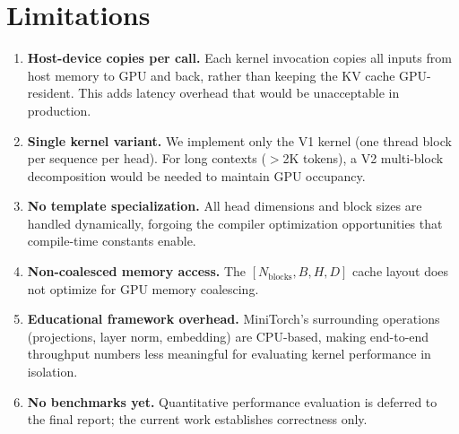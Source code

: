 \documentclass{article}
\begin{document}
\section{Limitations}
\label{sec:limitations}

\begin{enumerate}
    \item \textbf{Host-device copies per call.} Each kernel invocation copies all inputs from host memory to GPU and back, rather than keeping the KV cache GPU-resident. This adds latency overhead that would be unacceptable in production.
    
    \item \textbf{Single kernel variant.} We implement only the V1 kernel (one thread block per sequence per head). For long contexts ($>$2K tokens), a V2 multi-block decomposition would be needed to maintain GPU occupancy.
    
    \item \textbf{No template specialization.} All head dimensions and block sizes are handled dynamically, forgoing the compiler optimization opportunities that compile-time constants enable.
    
    \item \textbf{Non-coalesced memory access.} The $[N_{\text{blocks}}, B, H, D]$ cache layout does not optimize for GPU memory coalescing.
    
    \item \textbf{Educational framework overhead.} MiniTorch's surrounding operations (projections, layer norm, embedding) are CPU-based, making end-to-end throughput numbers less meaningful for evaluating kernel performance in isolation.
    
    \item \textbf{No benchmarks yet.} Quantitative performance evaluation is deferred to the final report; the current work establishes correctness only.
\end{enumerate}



\end{document}
